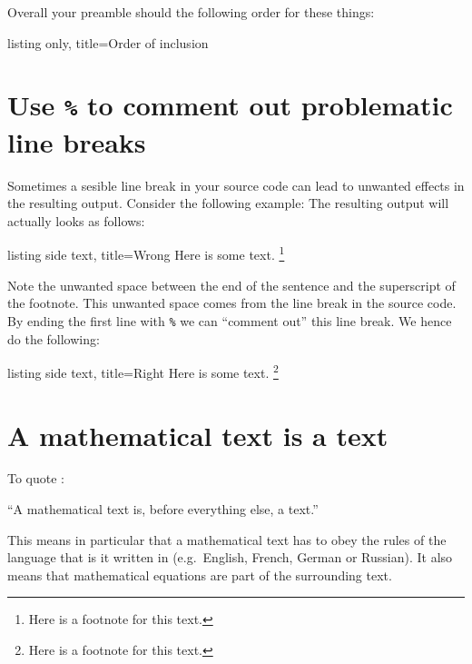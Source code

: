 \documentclass[a4paper, 10pt, headings=standardclasses, oneside, bibliography=totocnumbered]{scrbook}
\begin{document}
Overall your preamble should the following order for these things:
\begin{tcblisting}{listing only, title={Order of inclusion}}
\usepackage{amsthm}

\usepackage{hyperref}
\usepackage{cleveref}

\newtheorem{theorem}[everything]{Theorem}
\end{tcblisting}





\section{Use \texttt{\%} to comment out problematic line breaks}

Sometimes a sesible line break in your source code can lead to unwanted effects in the resulting output.
Consider the following example:
The resulting output will actually looks as follows:
\begin{tcblisting}{listing side text, title={Wrong}}
Here is some text.
\footnote{Here is a footnote for this text.}
\end{tcblisting}
Note the unwanted space between the end of the sentence and the superscript of the footnote.
This unwanted space comes from the line break in the source code.
By ending the first line with \texttt{\%} we can \enquote{comment out} this line break.
We hence do the following:
\begin{tcblisting}{listing side text, title={Right}}
Here is some text.%
\footnote{Here is a footnote for this text.}
\end{tcblisting}





\section{A mathematical text is a text}
\label{a mathematical text is a text}

To quote \cite{mathoverflow_text}:

\begin{center}
  \enquote{A mathematical text is, before everything else, a text.}
\end{center}

This means in particular that a mathematical text has to obey the rules of the language that is it written in (e.g.\ English, French, German or Russian).
It also means that mathematical equations are part of the surrounding text.
\end{document}

